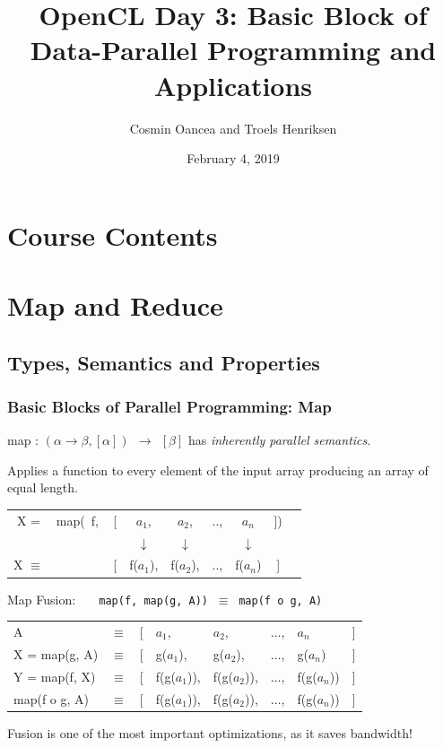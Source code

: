 \documentclass{beamer}
\title{OpenCL Day 3: Basic Block of Data-Parallel Programming and Applications}
\author{Cosmin Oancea and Troels Henriksen}
\date{February 4, 2019}
\renewcommand{\emph}[1]{\textcolor{CosGreen}{ #1}}
\newcommand{\emp}[1]{\textcolor{DikuRed}{ #1}}
\begin{document}
\frame{\titlepage}

\section{Course Contents}

\begin{frame}
  \tableofcontents
\end{frame}


\section{Map and Reduce}

\subsection{Types, Semantics and Properties}

\begin{frame}[fragile,t]
   \frametitle{Basic Blocks of Parallel Programming: Map}

\bigskip

\emp{map} : $(\alpha \to \beta, [\alpha]) ~~\to~~ [\beta] $ has \emph{\em inherently parallel semantics}.
\smallskip

Applies a function to every element of the input array producing an array of equal length.

\bigskip

\begin{tabular}{crcccccl}
X = & \emph{map}(~f, ~ [& $a_1$, & $a_2$, & .., & $a_n$ & ])\\
    &      & $\downarrow$ & $\downarrow$ &  & $\downarrow$ & &\\
X $\equiv$ &  [  & \emph{f($a_1$)}, & \emph{f($a_2$)}, & .., & \emph{f($a_n$)} & ] &
\end{tabular}
\bigskip\pause

\emp{Map Fusion:} \emph{{\tt~~~map(f, map(g, A))} $~\equiv~$ {\tt map(f o g, A)}} \bigskip

\begin{tabular}{llllllll}
A & $\equiv$ & [ & $a_1$, & $a_2$, & $\ldots$, & $a_n$ & ] \\  
X = map(g, A) & $\equiv$ & [ & g($a_1$), &g($a_2$), &$\ldots$, &g($a_n$) &]\\
\emph{Y = map(f, X)} & $\equiv$ & [& \emph{f(g($a_1$))}, &\emph{f(g($a_2$))}, &$\ldots$, &\emph{f(g($a_n$))} &]\\
\emph{map(f o g, A)} & $\equiv$ & [& \emph{f(g($a_1$))}, &\emph{f(g($a_2$))}, &$\ldots$, &\emph{f(g($a_n$))} &]\\
\end{tabular}
\bigskip

Fusion is one of the most important optimizations, as it saves bandwidth!

\end{frame}
\end{document}
